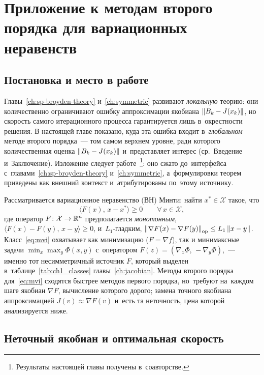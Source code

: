\chapter{Приложение к методам второго порядка для вариационных неравенств}\label{ch:viqa}

\section{Постановка и место в работе}\label{sec:viqa_setup}

Главы~\ref{ch:sp-broyden-theory} и~\ref{ch:symmetric} развивают
\emph{локальную} теорию: они количественно ограничивают ошибку
аппроксимации якобиана $\left\|B_k - J(x_k)\right\|$, но скорость самого
итерационного процесса гарантируется лишь в~окрестности решения. В
настоящей главе показано, куда эта ошибка входит в~\emph{глобальном}
методе второго порядка~--- том самом верхнем уровне, ради которого
количественная оценка $\left\|B_k - J(x_k)\right\|$ и~представляет интерес
(ср.~Введение и~Заключение). Изложение следует
работе~\cite{viqa2024}\footnote{Результаты настоящей главы получены
в~соавторстве.}: оно сжато до~интерфейса с~главами~\ref{ch:sp-broyden-theory}
и~\ref{ch:symmetric}, а~формулировки теорем приведены как внешний
контекст и~атрибутированы по~этому источнику.

Рассматривается вариационное неравенство (ВН) Минти: найти
$x^*\in\mathcal{X}$ такое, что
\begin{equation}\label{eq:mvi}
  \langle F(x),\, x - x^*\rangle \ge 0 \qquad \forall\, x\in\mathcal{X},
\end{equation}
где оператор $F\colon\mathcal{X}\to\mathbb{R}^n$ предполагается
\emph{монотонным}, $\langle F(x)-F(y),\,x-y\rangle\ge 0$, и~$L_1$-гладким,
$\left\|\nabla F(x)-\nabla F(y)\right\|_{\mathrm{op}}\le L_1\left\|x-y\right\|$.
Класс~\eqref{eq:mvi} охватывает как минимизацию ($F=\nabla f$), так и
минимаксные задачи $\min_x\max_y\Phi(x,y)$ с~оператором
$F(z)=(\nabla_x\Phi,\,-\nabla_y\Phi)$,~--- именно тот несимметричный
источник $F$, который выделен в~таблице~\ref{tab:ch1_classes}
главы~\ref{ch:jacobian}. Методы второго порядка для~\eqref{eq:mvi}
сходятся быстрее методов первого порядка, но~требуют на~каждом шаге
якобиан $\nabla F$, вычисление которого дорого; замена точного якобиана
аппроксимацией $J(v)\approx\nabla F(v)$ и~есть та неточность, цена
которой анализируется ниже.

\section{Неточный якобиан и оптимальная скорость}\label{sec:viqa_rate}

